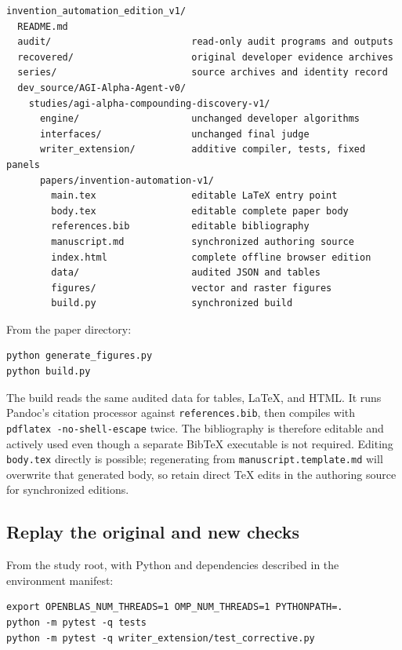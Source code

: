 \begin{verbatim}
invention_automation_edition_v1/
  README.md
  audit/                         read-only audit programs and outputs
  recovered/                     original developer evidence archives
  series/                        source archives and identity record
  dev_source/AGI-Alpha-Agent-v0/
    studies/agi-alpha-compounding-discovery-v1/
      engine/                    unchanged developer algorithms
      interfaces/                unchanged final judge
      writer_extension/          additive compiler, tests, fixed panels
      papers/invention-automation-v1/
        main.tex                 editable LaTeX entry point
        body.tex                 editable complete paper body
        references.bib           editable bibliography
        manuscript.md            synchronized authoring source
        index.html               complete offline browser edition
        data/                    audited JSON and tables
        figures/                 vector and raster figures
        build.py                 synchronized build
\end{verbatim}

From the paper directory:

\begin{verbatim}
python generate_figures.py
python build.py
\end{verbatim}

The build reads the same audited data for tables, LaTeX, and HTML. It
runs Pandoc's citation processor against \texttt{references.bib}, then
compiles with \texttt{pdflatex\ -no-shell-escape} twice. The
bibliography is therefore editable and actively used even though a
separate BibTeX executable is not required. Editing \texttt{body.tex}
directly is possible; regenerating from \texttt{manuscript.template.md}
will overwrite that generated body, so retain direct TeX edits in the
authoring source for synchronized editions.

\subsection*{Replay the original and new
checks}\label{replay-the-original-and-new-checks}

From the study root, with Python and dependencies described in the
environment manifest:

\begin{verbatim}
export OPENBLAS_NUM_THREADS=1 OMP_NUM_THREADS=1 PYTHONPATH=.
python -m pytest -q tests
python -m pytest -q writer_extension/test_corrective.py
\end{verbatim}

